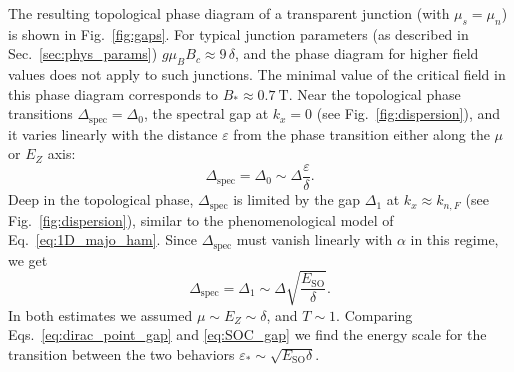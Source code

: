 The resulting topological phase diagram of a transparent junction (with $\mu_s = \mu_n$) is shown in Fig.~\ref{fig:gaps}.
For typical junction parameters (as described in Sec.~\ref{sec:phys_params}) $g\mu_B B_c \approx 9\,\delta$, and the phase diagram for higher field values does not apply to such junctions.
The minimal value of the critical field in this phase diagram corresponds to $B_*\approx \SI{0.7}{\tesla}$.
Near the topological phase transitions $\Delta_\textrm{spec} = \Delta_0$, the spectral gap at $k_x=0$ (see Fig.~\ref{fig:dispersion}), and it varies linearly with the distance $\varepsilon$ from the phase transition either along the $\mu$ or $E_Z$ axis:
\begin{equation}
  \label{eq:dirac_point_gap}
  \Delta_\textrm{spec} = \Delta_0 \sim \Delta \frac{\varepsilon}{\delta}.
\end{equation}
Deep in the topological phase, $\Delta_\textrm{spec}$ is limited by the gap $\Delta_1$ at $k_x \approx k_{n,F}$ (see Fig.~\ref{fig:dispersion}), similar to the phenomenological model of Eq.~\eqref{eq:1D_majo_ham}.
Since $\Delta_\textrm{spec}$ must vanish linearly with $\alpha$ in this regime, we get
\begin{equation}
  \label{eq:SOC_gap}
  \Delta_\textrm{spec} = \Delta_1 \sim \Delta \sqrt{\frac{E_{\textrm{SO}}}{\delta}}.
\end{equation}
In both estimates we assumed $\mu \sim E_Z \sim \delta$, and $T\sim 1$.
Comparing Eqs.~\eqref{eq:dirac_point_gap} and \eqref{eq:SOC_gap} we find the energy scale for the transition between the two behaviors $\varepsilon_* \sim \sqrt{E_\textrm{SO} \delta}$.

